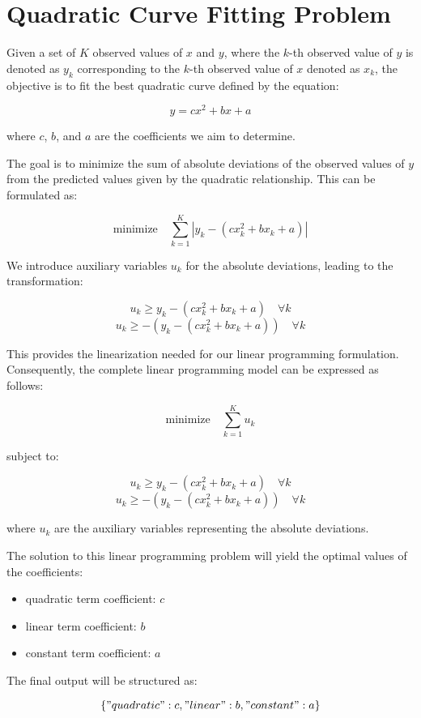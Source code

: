 \documentclass{article}
\begin{document}
\section*{Quadratic Curve Fitting Problem}

Given a set of $K$ observed values of $x$ and $y$, where the $k$-th observed value of $y$ is denoted as $y_k$ corresponding to the $k$-th observed value of $x$ denoted as $x_k$, the objective is to fit the best quadratic curve defined by the equation:

\[
y = c x^2 + b x + a
\]

where $c$, $b$, and $a$ are the coefficients we aim to determine.

The goal is to minimize the sum of absolute deviations of the observed values of $y$ from the predicted values given by the quadratic relationship. This can be formulated as:

\[
\text{minimize} \quad \sum_{k=1}^{K} |y_k - (c x_k^2 + b x_k + a)|
\]

We introduce auxiliary variables $u_k$ for the absolute deviations, leading to the transformation:

\[
u_k \geq y_k - (c x_k^2 + b x_k + a) \quad \forall k
\]
\[
u_k \geq -(y_k - (c x_k^2 + b x_k + a)) \quad \forall k
\]

This provides the linearization needed for our linear programming formulation. Consequently, the complete linear programming model can be expressed as follows:

\[
\text{minimize} \quad \sum_{k=1}^{K} u_k
\]

subject to:

\[
u_k \geq y_k - (c x_k^2 + b x_k + a) \quad \forall k
\]
\[
u_k \geq -(y_k - (c x_k^2 + b x_k + a)) \quad \forall k
\]

where $u_k$ are the auxiliary variables representing the absolute deviations.

The solution to this linear programming problem will yield the optimal values of the coefficients:

\begin{itemize}
    \item quadratic term coefficient: $c$
    \item linear term coefficient: $b$
    \item constant term coefficient: $a$
\end{itemize}

The final output will be structured as:

\[
\{ "quadratic": c, "linear": b, "constant": a \}
\]
\end{document}
